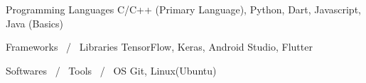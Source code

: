 

\begin{cvskills}

  \cvskill
    {Programming Languages} %
    {C/C++ (Primary Language), Python, Dart, Javascript, Java (Basics)} %


  \cvskill
    {Frameworks \, / \, Libraries} %
    {TensorFlow, Keras, Android Studio, Flutter} %

\cvskill
    {Softwares \, / \, Tools \, / \, OS} %
    {Git, Linux(Ubuntu)} %

\end{cvskills}

